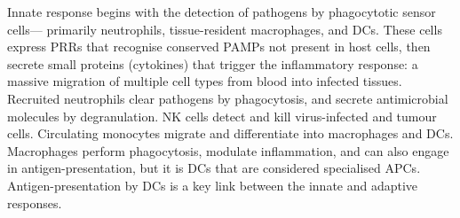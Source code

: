 \begin{outline}
Innate response begins with the detection of pathogens by phagocytotic sensor cells---
primarily neutrophils, tissue-resident macrophages, and \glspl{DC}.
These cells express \glspl{PRR} that recognise conserved \glspl{PAMP} not present in host cells,
then secrete small proteins (cytokines) that trigger the inflammatory response:
a massive migration of multiple cell types from blood into infected tissues.
Recruited neutrophils clear pathogens by phagocytosis, and secrete antimicrobial molecules by degranulation.
\Gls{NK} cells detect and kill virus-infected and tumour cells.
Circulating monocytes migrate and differentiate into macrophages and \glspl{DC}.
Macrophages perform phagocytosis, modulate inflammation, and can also engage in antigen-presentation,
but it is \glspl{DC} that are considered specialised \glspl{APC}.
Antigen-presentation by \glspl{DC} is a key link between the innate and adaptive responses.


\end{outline}
